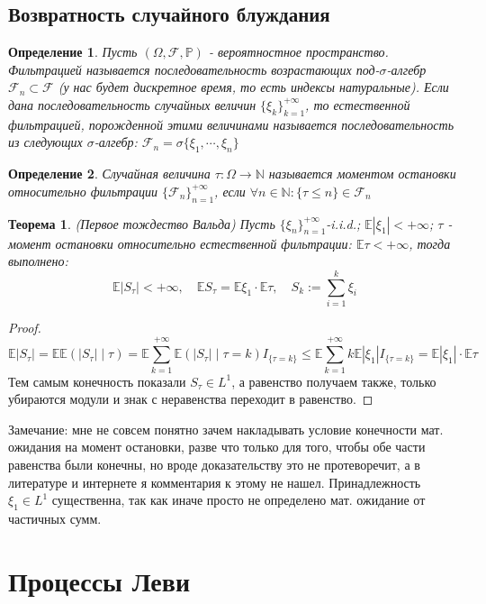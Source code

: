 \documentclass[12pt,a4paper]{article} %
\newtheorem{theorem}{Теорема}
\newtheorem{definition}{Определение}
\newcommand{\E}{\mathbb{E}}
\newcommand{\PR}{\mathbb{P}}
\begin{document}
	\subsection{Возвратность случайного блуждания}
	\begin{definition}
		Пусть $(\Omega,\mathcal{F},\PR)$ - вероятностное пространство. Фильтрацией называется последовательность возрастающих под-$\sigma$-алгебр $\mathcal{F}_n\subset\mathcal{F}$ (у нас будет дискретное время, то есть индексы натуральные). Если дана последовательность случайных величин $\{\xi_k\}_{k=1}^{+\infty}$, то естественной фильтрацией, порожденной этими величинами называется последовательность из следующих $\sigma$-алгебр: $\mathcal{F}_n=\sigma\{\xi_1,\cdots,\xi_n\}$
	\end{definition}
	\begin{definition}
		Случайная величина $\tau:\Omega\rightarrow\mathbb{N}$ называется моментом остановки относительно фильтрации $\{\mathcal{F}_n\}_{n=1}^{+\infty}$, если $\forall n\in\mathbb{N}:\{\tau\leq n\}\in\mathcal{F}_n$
	\end{definition}
	\begin{theorem}
		(Первое тождество Вальда) Пусть $\{\xi_n\}_{n=1}^{+\infty}$-i.i.d.; $\E|\xi_1|<+\infty$; $\tau$ - момент остановки относительно естественной фильтрации: $\E\tau<+\infty$, тогда выполнено:
		$$\E|S_{\tau}|<+\infty,\quad\E S_{\tau}=\E\xi_1\cdot\E\tau,\quad S_k:=\sum_{i=1}^k\xi_i$$
	\end{theorem}
	\begin{proof}
		$$\E|S_{\tau}|=\E\E(|S_{\tau}|\mid\tau)=\E\sum_{k=1}^{+\infty}\E(|S_{\tau}|\mid\tau=k)I_{\{\tau=k\}}\leq\E\sum_{k=1}^{+\infty}k\E|\xi_1|I_{\{\tau=k\}}=\E|\xi_1|\cdot\E\tau$$
		Тем самым конечность показали $S_{\tau}\in L^1$, а равенство получаем также, только убираются модули и знак с неравенства переходит в равенство.
	\end{proof}
	Замечание: мне не совсем понятно зачем накладывать условие конечности мат. ожидания на момент остановки, разве что только для того, чтобы обе части равенства были конечны, но вроде доказательству это не протеворечит, а в литературе и интернете я комментария к этому не нашел. Принадлежность $\xi_1\in L^1$ существенна, так как иначе просто не определено мат. ожидание от частичных сумм.
	\section{Процессы Леви}
\end{document}
